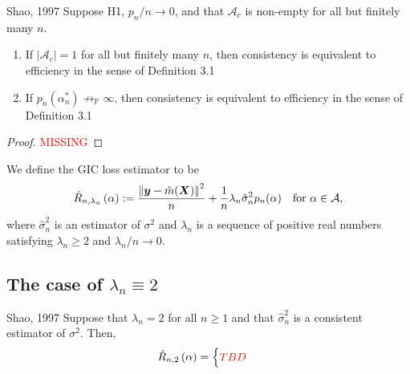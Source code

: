 \documentclass[12pt, letter paper]{article}
\newcommand{\1}{\mathmybb{1}}
\newcommand{\0}{\emptyset}
\newcommand{\prob}{\mathbb{P}}
\newcommand{\paren}[1]{\left(#1 \right)}
\newcommand{\norm}[1]{\left|\hspace{-1pt}\left|#1 \right|\hspace{-1pt}\right|}
\newcommand{\normsq}[1]{\norm{#1}^{2}}
\newcommand{\Acal}{\mathcal{A}}
\newcommand{\X}{\boldsymbol{X}}
\newcommand{\y}{\boldsymbol{y}}
\newcommand{\Rhat}[2]{\hat{R}_{n, #1}\paren{#2}}
\newcommand{\sigmahat}{\hat{\sigma}^{2}_{n}}
\begin{document}
\begin{proposition}[Proposition]{{Shao, 1997}}
    Suppose H1, \(p_{n}/n\to 0\), and that \(\Acal_{c}\) is non-empty for all but finitely many \(n\).
    \begin{enumerate}
        \item If \(|\Acal_{c}|=1\) for all but finitely many \(n\), then consistency is equivalent to efficiency in the sense of Definition 3.1
        \item If \(p_{n}(\alpha^{*}_{n})\not\to_{\prob}\infty\), then consistency is equivalent to efficiency in the sense of Definition 3.1
    \end{enumerate}
\end{proposition}
\begin{proof}
    \textcolor{red}{MISSING}
\end{proof}

\begin{definition}
    We define the GIC loss estimator to be
    \[\Rhat{\lambda_{n}}{\alpha} := \frac{\normsq{\y - \hat{m}(\X)}}{n} + \frac{1}{n}\lambda_{n}\sigmahat p_{n}(\alpha)\quad\text{for }\alpha\in\Acal,\]
    where \(\sigmahat\) is an estimator of \(\sigma^{2}\) and \(\lambda_{n}\) is a sequence of positive real numbers satisfying \(\lambda_{n}\geq 2\) and \(\lambda_{n}/n\to 0\).
\end{definition}

\subsection{The case of \(\lambda_{n} \equiv 2\)}

\begin{proposition}{{Shao, 1997}}
    Suppose that \(\lambda_{n}=2\) for all \(n\geq 1\) and that \(\sigmahat\) is a consistent estimator of \(\sigma^{2}\). Then,
    \[\Rhat{2}{\alpha} = \begin{cases}
        \textcolor{red}{TBD}
    \end{cases}\]
\end{proposition}
\end{document}
